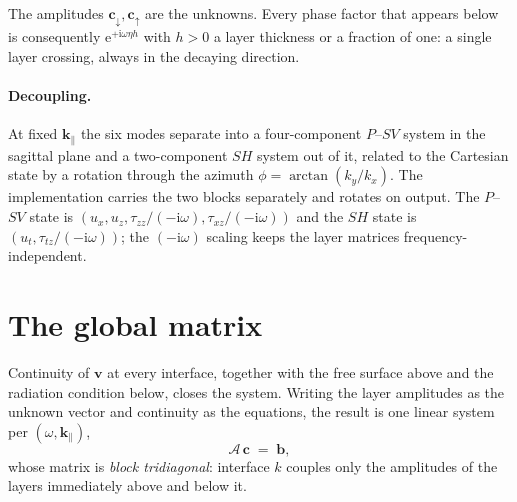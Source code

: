 \documentclass[11pt,a4paper]{article}
\newcommand{\ii}{\mathrm{i}}
\newcommand{\bb}{\mathbf{b}}
\newcommand{\bv}{\mathbf{v}}
\newcommand{\kpar}{\mathbf{k}_{\parallel}}
\begin{document}
The amplitudes $\mathbf{c}_{\downarrow},\mathbf{c}_{\uparrow}$ are the unknowns.
Every phase factor that appears below is consequently
$\mathrm{e}^{+\ii\omega\eta h}$ with $h>0$ a layer thickness or a fraction of
one: a single layer crossing, always in the decaying direction.

\paragraph{Decoupling.} At fixed $\kpar$ the six modes separate into a
four-component $P$--$SV$ system in the sagittal plane and a two-component $SH$
system out of it, related to the Cartesian state by a rotation through the
azimuth $\phi=\arctan(k_y/k_x)$. The implementation carries the two blocks
separately and rotates on output. The $P$--$SV$ state is
$(u_x,u_z,\tau_{zz}/(-\ii\omega),\tau_{xz}/(-\ii\omega))$ and the $SH$ state is
$(u_t,\tau_{tz}/(-\ii\omega))$; the $(-\ii\omega)$ scaling keeps the layer
matrices frequency-independent.

\section{The global matrix}

Continuity of $\bv$ at every interface, together with the free surface above and
the radiation condition below, closes the system. Writing the layer amplitudes
as the unknown vector and continuity as the equations, the result is one linear
system per $(\omega,\kpar)$,
\begin{equation}\label{eq:global}
  \mathcal{A}\,\mathbf{c} \;=\; \bb,
\end{equation}
whose matrix is \emph{block tridiagonal}: interface $k$ couples only the
amplitudes of the layers immediately above and below it.
\end{document}
